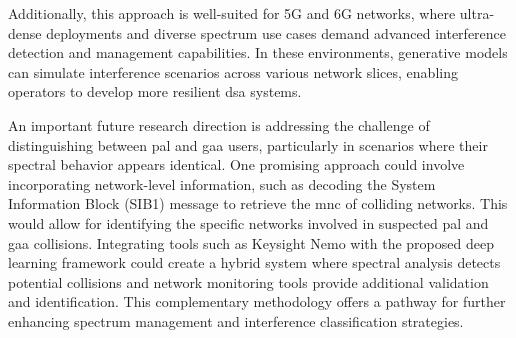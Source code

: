 Additionally, this approach is well-suited for 5G and 6G networks, where ultra-dense deployments and diverse spectrum use cases demand advanced interference detection and management capabilities. In these environments, generative models can simulate interference scenarios across various network slices, enabling operators to develop more resilient \gls{dsa} systems.  

An important future research direction is addressing the challenge of distinguishing between \gls{pal} and \gls{gaa} users, particularly in scenarios where their spectral behavior appears identical. One promising approach could involve incorporating network-level information, such as decoding the System Information Block (SIB1)  message to retrieve the \gls{mnc} of colliding networks. This would allow for identifying the specific networks involved in suspected \gls{pal} and \gls{gaa} collisions. Integrating tools such as Keysight Nemo with the proposed deep learning framework could create a hybrid system where spectral analysis detects potential collisions and network monitoring tools provide additional validation and identification. This complementary methodology offers a pathway for further enhancing spectrum management and interference classification strategies. 

